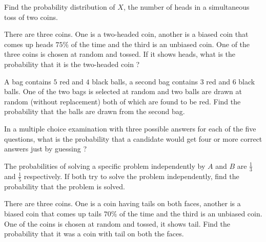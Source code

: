 
\item Find the probability distribution of $X$, the number of heads in a simultaneous toss of two coins.

\item There are three coins. One is a two-headed coin, another is a biased coin that comes up heads $75\%$ of the time and the third is an unbiased coin. One of the three coins is chosen at random and tossed. If it shows heads, what is the probability that it is the two-headed coin ?

\item A bag contains $5$ red and $4$ black balls, a second bag contains $3$ red and $6$ black balls. One of the two bags is selected at random and two balls are drawn at random (without replacement) both of which are found to be red. Find the probability that the balls are drawn from the second bag.

\item In a multiple choice examination with three possible answers for each of the five questions, what is the probability that a candidate would get four or more correct answers just by guessing ?

\item The probabilities of solving a specific problem independently by $A$ and $B$ are $\frac{1}{3}$ and $\frac{1}{5}$ respectively. If both try to solve the problem independently, find the probability that the problem is solved.

\item There are three coins. One is a coin having tails on both faces, another is a biased coin that comes up tails $70\%$ of the time and the third is an unbiased coin. One of the coins is chosen at random and tossed, it shows tail. Find the probability that it was a coin with tail on both the faces.


